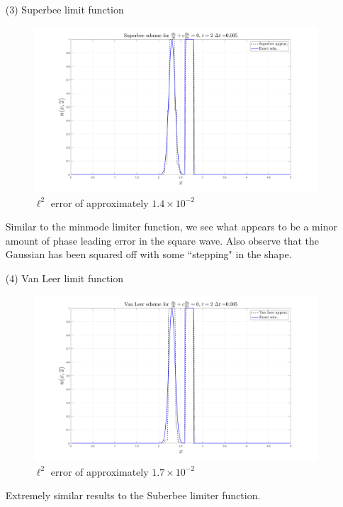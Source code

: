 \documentclass{article}
\begin{document}
\begin{itemize}
    \pagebreak
    \item[(3)] Superbee limit function
    \newline\newline

    \begin{figure}[H]
        \centering
        \includegraphics[scale = 0.25]{superbee_dt_005.png}
        \caption{$\ell^2$ error of approximately $1.4 \times 10^{-2}$}
    \end{figure}
    Similar to the minmode limiter function, we see what appears to be a minor amount of phase leading error in the square wave. Also observe that the Gaussian has been squared off with some ``stepping" in the shape.

    \pagebreak
    \item[(4)] Van Leer limit function
    \newline\newline

    \begin{figure}[H]
        \centering
        \includegraphics[scale = 0.25]{van_leer_dt_005.png}
        \caption{$\ell^2$ error of approximately $1.7 \times 10^{-2}$}
    \end{figure}
    Extremely similar results to the Suberbee limiter function.
\end{itemize}
\end{document}
